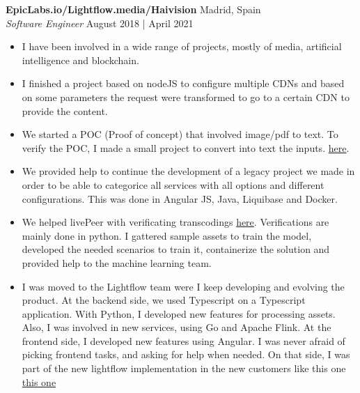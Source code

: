 \documentclass[a4paper]{article}
\begin{document}
\textbf{EpicLabs.io/Lightflow.media/Haivision} \hfill Madrid, Spain\\
\textit{Software Engineer} \hfill August 2018 | April 2021\\
\vspace{-1mm}
\begin{itemize} \itemsep 1pt
    \item I have been involved in a wide range of projects, mostly of media, artificial intelligence and blockchain.
    \item I finished a project based on nodeJS to configure multiple CDNs and based on some parameters the request were transformed to go to a certain CDN to provide the content.
    \item We started a POC (Proof of concept) that involved image/pdf to text. To verify the POC, I made a small project to convert into text the inputs. \href{https://github.com/dionisioC/pythonOCR}{here}.
    \item We provided help to continue the development of a legacy project we made in order to be able to categorice all services with all options and different configurations. This was done in Angular JS, Java, Liquibase and Docker.
    \item We helped livePeer with verificating transcodings \href{https://github.com/livepeer/verification-classifier}{here}. Verifications are mainly done in python.  I gattered sample assets to train the model, developed the needed scenarios to train it, containerize the solution and provided help to the machine learning team.
    \item I was moved to the Lightflow team were I keep developing and evolving the product. At the backend side, we used Typescript on a Typescript application. With Python, I developed new features for processing assets. Also, I was involved in new services, using Go and Apache Flink. 
At the frontend side, I developed new features using Angular. I was never afraid of picking frontend tasks, and asking for help when needed. On that side, I was part of the new lightflow implementation in the new customers like this one \href{https://www.linkedin.com/posts/jesusoliva_intelligent-encoding-drives-dramatic-cost-activity-6709093686086647808-ruhL}{this one}
\end{itemize}
\end{document}
